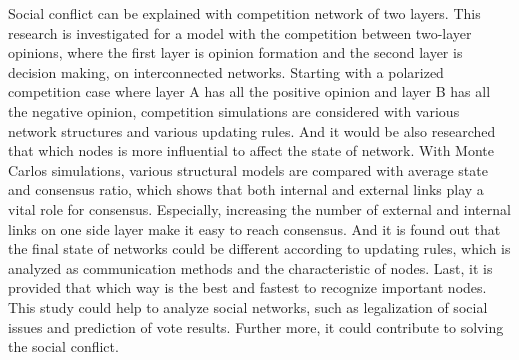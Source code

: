 
\begin{bigabstract}
Social conflict can be explained with competition network of two layers. This research is investigated for a model with the competition between two-layer opinions, where the first layer is opinion formation and the second layer is decision making, on interconnected networks. Starting with a polarized competition case where layer A has all the positive opinion and layer B has all the negative opinion, competition simulations are considered with various network structures and various updating rules. And it would be also researched that which nodes is more influential to affect the state of network. With Monte Carlos simulations, various structural models are compared with average state and consensus ratio, which shows that both internal and external links play a vital role for consensus. Especially, increasing the number of external and internal links on one side layer make it easy to reach consensus. And it is found out that the final state of networks could be different according to updating rules, which is analyzed as communication methods and the characteristic of nodes. Last, it is provided that which way is the best and fastest to recognize important nodes. This study could help to analyze social networks, such as legalization of social issues and prediction of vote results. Further more, it could contribute to solving the social conflict.
\end{bigabstract}